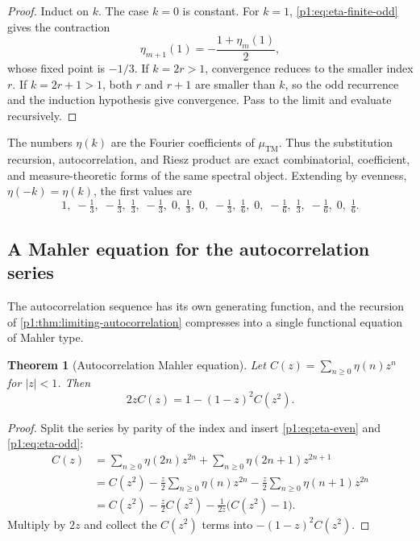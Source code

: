 \documentclass[11pt,oneside]{article}
\numberwithin{equation}{section}
\newtheorem{theorem}{Theorem}[section]
\theoremstyle{definition}
\theoremstyle{remark}
\begin{document}
\begin{proof}
Induct on \(k\).  The case \(k=0\) is constant.  For \(k=1\),
\eqref{p1:eq:eta-finite-odd} gives the contraction
\[
 \eta_{m+1}(1)=-\frac{1+\eta_m(1)}2,
\]
whose fixed point is \(-1/3\).  If \(k=2r>1\), convergence reduces to the
smaller index \(r\).  If \(k=2r+1>1\), both \(r\) and \(r+1\) are smaller
than \(k\), so the odd recurrence and the induction hypothesis give
convergence.  Pass to the limit and evaluate recursively.
\end{proof}

The numbers \(\eta(k)\) are the Fourier coefficients of
\(\mu_{\mathrm{TM}}\).  Thus the substitution recursion, autocorrelation, and
Riesz product are exact combinatorial, coefficient, and measure-theoretic
forms of the same spectral object.  Extending by evenness,
\(\eta(-k)=\eta(k)\), the first values are
\begin{equation}
 1,\;-\tfrac13,\;-\tfrac13,\;\tfrac13,\;-\tfrac13,\;0,\;\tfrac13,\;0,\;
 -\tfrac13,\;\tfrac16,\;0,\;-\tfrac16,\;\tfrac13,\;-\tfrac16,\;0,\;\tfrac16.
 \label{p1:eq:eta-first-values}
\end{equation}

\subsection{A Mahler equation for the autocorrelation series}

The autocorrelation sequence has its own generating function, and the
recursion of \cref{p1:thm:limiting-autocorrelation} compresses into a single
functional equation of Mahler type.

\begin{theorem}[Autocorrelation Mahler equation]
\label{p1:thm:autocorrelation-mahler}
Let \(C(z)=\sum_{n\ge0}\eta(n)z^n\) for \(|z|<1\).  Then
\begin{equation}
  \boxed{
  2zC(z)=1-(1-z)^2C(z^2).}
  \label{p1:eq:autocorrelation-mahler}
\end{equation}
\end{theorem}

\begin{proof}
Split the series by parity of the index and insert
\eqref{p1:eq:eta-even} and \eqref{p1:eq:eta-odd}:
\begin{align*}
 C(z)
 &=\sum_{n\ge0}\eta(2n)z^{2n}
  +\sum_{n\ge0}\eta(2n+1)z^{2n+1}\\
 &=C(z^2)
  -\frac z2\sum_{n\ge0}\eta(n)z^{2n}
  -\frac z2\sum_{n\ge0}\eta(n+1)z^{2n}\\
 &=C(z^2)-\frac z2C(z^2)
  -\frac1{2z}\bigl(C(z^2)-1\bigr).
\end{align*}
Multiply by \(2z\) and collect the \(C(z^2)\) terms into
\(-(1-z)^2C(z^2)\).
\end{proof}
\end{document}
